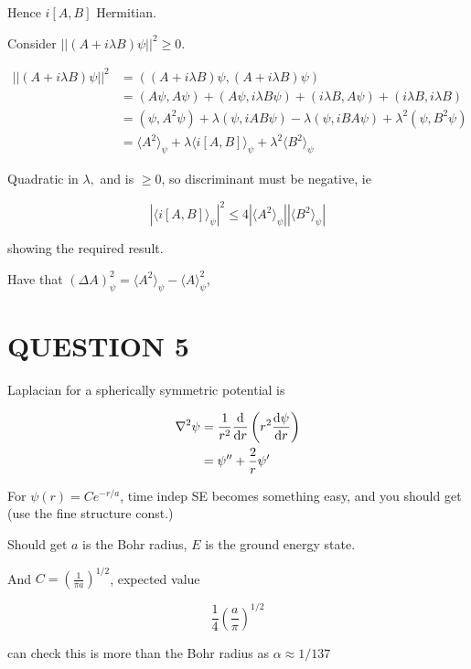 \documentclass[a4paper]{article}
\begin{document}
Hence $ i[A,B] $ Hermitian.

Consider $ | |  (A + i \lambda B) \psi | |^{2} \geq 0 $.

\begin{align*}
| |  (A + i \lambda B) \psi | |^{2} & = ( (A + i \lambda B) \psi, (A + i \lambda B) \psi ) \\
& = (A \psi, A \psi) + (A \psi, i \lambda B \psi) + (i \lambda B, A \psi) + (i \lambda B, i \lambda B) \\
& = (\psi, A^{2} \psi) +  \lambda (\psi, i A B \psi) -  \lambda (\psi, i B A \psi) + \lambda^{2} (\psi, B^{2} \psi) \\
& = \langle A^{2} \rangle_{\psi} + \lambda \langle i [A,B] \rangle_{\psi} + \lambda^{2} \langle B^{2} \rangle_{\psi}
\end{align*}

Quadratic in $ \lambda,$ and is  $ \geq 0 $, so discriminant must be negative, ie

\[ \left|  \langle i [A,B] \rangle_{\psi} \right|^{2} \leq 4 \left| \langle A^{2} \rangle_{\psi}  \right| \left| \langle B^{2} \rangle_{\psi}  \right| \]

showing the required result.

Have that $ (\Delta A)_{\psi}^{2}  = \langle A^{2} \rangle_{\psi} - \langle A \rangle_{\psi}^{2} $, 

\section{QUESTION 5}

Laplacian for a spherically symmetric potential is

\begin{align*}
\nabla^{2} \psi & = \frac{1}{r^{2}} \frac{\mathrm{d} }{\mathrm{d} r} \left( r^{2} \frac{\mathrm{d} \psi }{\mathrm{d} r} \right)  \\
& = \psi'' + \frac{2}{r} \psi'
\end{align*}

For $ \psi(r) = C e^{-r/a}$, time indep SE becomes something easy, and you should get (use the fine structure const.)

Should get $ a $ is the Bohr radius, $ E $ is the ground energy state.

And $ C = \left( \frac{1}{\pi a} \right)^{1/2}  $, expected value 

\[ \frac{1}{4} \left(  \frac{a}{\pi} \right)^{1/2}  \]

can check this is more than the Bohr radius as $ \alpha \approx 1/137 $
\end{document}
